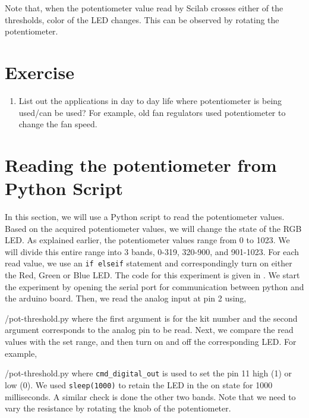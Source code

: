 Note that, when the potentiometer value read by Scilab crosses either
of the thresholds, color of the LED changes. This can be observed by
rotating the potentiometer.

\section{Exercise}
\begin{enumerate}
\item List out the applications in day to day life where potentiometer
  is being used/can be used? For example, old fan regulators used
  potentiometer to change the fan speed.
\end{enumerate}


\section{Reading the potentiometer from Python Script}
In this section, we will use a Python script to read the potentiometer values.  Based on the acquired potentiometer values, we will change the state of the RGB LED. As explained earlier, the potentiometer values range from 0 to 1023. We will divide this entire range into 3 bands, 0-319, 320-900, and 901-1023. For each read value, we use an {\tt if elseif} statement and correspondingly turn on either the Red, Green or Blue LED. The code for this experiment is given in
. We start the experiment by opening the serial port for communication between python and the arduino board. Then, we read the analog input at pin 2 using,

{\LocPotpycode/pot-threshold.py} where the first argument is for
the kit number and the second argument corresponds to the analog pin to be read.  Next, we compare the read values with the set range, and then turn on and off the corresponding LED. For example, 

{\LocPotpycode/pot-threshold.py} where {\tt cmd\_digital\_out} is used to set the pin 11 high (1) or low (0). We used {\tt sleep(1000)} to retain the LED in the on state for 1000 milliseconds.  A similar check is done the other two bands. Note that we need to vary the resistance by rotating the knob of the potentiometer.




